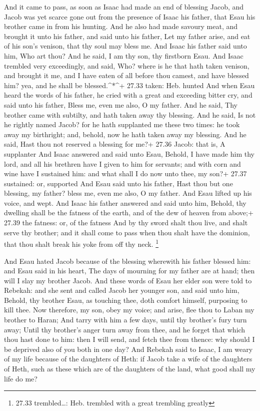  And it came to pass, as soon as Isaac had made an end of
blessing Jacob, and Jacob was yet scarce gone out from the presence of
Isaac his father, that Esau his brother came in from his hunting.
 And he also had made savoury meat, and brought it unto his
father, and said unto his father, Let my father arise, and eat of his
son's venison, that thy soul may bless me.  And Isaac his
father said unto him, Who art thou? And he said, I am thy son, thy
firstborn Esau.  And Isaac trembled very exceedingly, and
said, Who? where is he that hath taken venison, and brought it me, and I
have eaten of all before thou camest, and have blessed him? yea, and he
shall be blessed.\^{}*\^{}+ 27.33 taken: Heb. hunted  And
when Esau heard the words of his father, he cried with a great and
exceeding bitter cry, and said unto his father, Bless me, even me also,
O my father.  And he said, Thy brother came with subtilty,
and hath taken away thy blessing.  And he said, Is not he
rightly named Jacob? for he hath supplanted me these two times: he took
away my birthright; and, behold, now he hath taken away my blessing. And
he said, Hast thou not reserved a blessing for me?+ 27.36 Jacob: that
is, A supplanter  And Isaac answered and said unto Esau,
Behold, I have made him thy lord, and all his brethren have I given to
him for servants; and with corn and wine have I sustained him: and what
shall I do now unto thee, my son?+ 27.37 sustained: or, supported
 And Esau said unto his father, Hast thou but one blessing,
my father? bless me, even me also, O my father. And Esau lifted up his
voice, and wept.  And Isaac his father answered and said
unto him, Behold, thy dwelling shall be the fatness of the earth, and of
the dew of heaven from above;+ 27.39 the fatness: or, of the fatness
 And by thy sword shalt thou live, and shalt serve thy
brother; and it shall come to pass when thou shalt have the dominion,
that thou shalt break his yoke from off thy neck. \footnote{27.33
  trembled\ldots: Heb. trembled with a great trembling greatly}

 And Esau hated Jacob because of the blessing wherewith his
father blessed him: and Esau said in his heart, The days of mourning for
my father are at hand; then will I slay my brother Jacob. 
And these words of Esau her elder son were told to Rebekah: and she sent
and called Jacob her younger son, and said unto him, Behold, thy brother
Esau, as touching thee, doth comfort himself, purposing to kill thee.
 Now therefore, my son, obey my voice; and arise, flee thou
to Laban my brother to Haran;  And tarry with him a few
days, until thy brother's fury turn away;  Until thy
brother's anger turn away from thee, and he forget that which thou hast
done to him: then I will send, and fetch thee from thence: why should I
be deprived also of you both in one day?  And Rebekah said
to Isaac, I am weary of my life because of the daughters of Heth: if
Jacob take a wife of the daughters of Heth, such as these which are of
the daughters of the land, what good shall my life do me?

